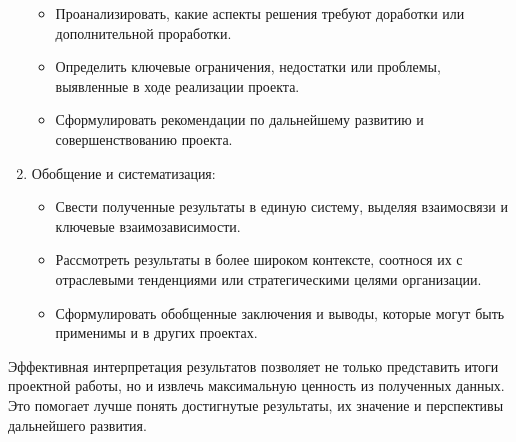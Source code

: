 \begin{enumerate}
\begin{itemize}
                \item Проанализировать, какие аспекты решения требуют доработки или дополнительной проработки.
                \item Определить ключевые ограничения, недостатки или проблемы, выявленные в ходе реализации проекта.
                \item Сформулировать рекомендации по дальнейшему развитию и совершенствованию проекта.
            \end{itemize}
        \item Обобщение и систематизация:
            \begin{itemize}
                \item Свести полученные результаты в единую систему, выделяя взаимосвязи и ключевые взаимозависимости.
                \item Рассмотреть результаты в более широком контексте, соотнося их с отраслевыми тенденциями или стратегическими целями организации.
                \item Сформулировать обобщенные заключения и выводы, которые могут быть применимы и в других проектах.
            \end{itemize}
    \end{enumerate}

    Эффективная интерпретация результатов позволяет не только представить итоги проектной работы, но и извлечь максимальную ценность из полученных данных. Это помогает лучше понять достигнутые результаты, их значение и перспективы дальнейшего развития.

